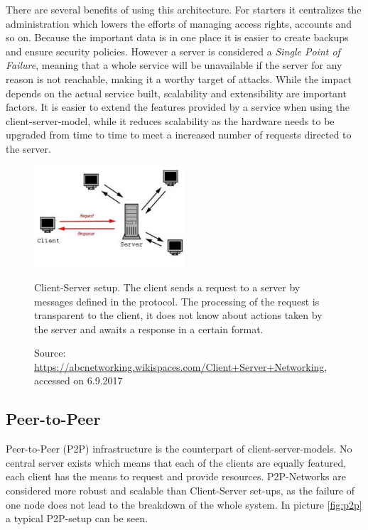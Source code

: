 There are several benefits of using this architecture. For starters it centralizes the administration which lowers the efforts of managing access rights, accounts and so on. Because the important data is in one place it is easier to create backups and ensure security policies. However a server is considered a \emph{Single Point of Failure}, meaning that a whole service will be unavailable if the server for any reason is not reachable, making it a worthy target of attacks. While the impact depends on the actual service built, scalability and extensibility are important factors. It is easier to extend the features provided by a service when using the client-server-model, while it reduces scalability as the hardware needs to be upgraded from time to time to meet a increased number of requests directed to the server.
\begin{figure}[htbp]
	\centering
	\includegraphics[width=0.5\textwidth]{./content/pictures/client-server.jpg}
	\caption{Client-Server setup. The client sends a request to a server by messages defined in the protocol. The processing of the request is transparent to the client, it does not know about actions taken by the server and awaits a response in a certain format.}
	\caption*{Source: \href{https://abcnetworking.wikispaces.com/Client+Server+Networking}{https://abcnetworking.wikispaces.com/Client+Server+Networking}, accessed on 6.9.2017}
\end{figure}

\subsection{Peer-to-Peer}
Peer-to-Peer (P2P) infrastructure is the counterpart of client-server-models. No central server exists which means that each of the clients are equally featured, each client has the means to request and provide resources. P2P-Networks are considered more robust and scalable than Client-Server set-ups, as the failure of one node does not lead to the breakdown of the whole system. In picture \ref{fig:p2p} a typical P2P-setup can be seen. 

